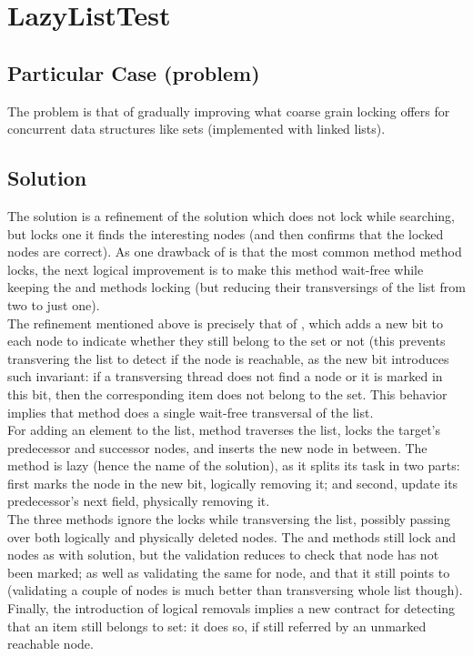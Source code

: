 \section{\textbf{LazyListTest}}

\subsection{Particular Case (problem)}
The problem is that of gradually improving what coarse grain locking
offers for concurrent data structures like sets (implemented with
linked lists).

\subsection{Solution}
The  solution is a refinement of the 
solution which does not lock while searching, but locks one it finds
the interesting nodes (and then confirms that the locked nodes are
correct). As one drawback of  is that the most
common method  method locks, the next logical improvement
is to make this method wait-free while keeping the  and
 methods locking (but reducing their transversings of the
list from two to just one). \\

The refinement mentioned above is precisely that of ,
which adds a new bit to each node to indicate whether they still
belong to the set or not (this prevents transvering the list to detect
if the node is reachable, as the new bit introduces such invariant: if
a transversing thread does not find a node or it is marked in this
bit, then the corresponding item does not belong to the set. This
behavior implies that  method does a single wait-free
transversal of the list. \\

For adding an element to the list,  method traverses the list,
locks the target's predecessor and successor nodes, and inserts the
new node in between. The    
method is lazy (hence the name of the solution), as it splits its task in
two parts: first marks the node in the new bit, logically removing it;
and second, update its predecessor's next field, physically removing
it. \\

The three methods ignore the locks while transversing the list,
possibly passing over both logically and physically deleted nodes. The
 and  methods still lock  and  nodes
as with  solution, but the validation reduces to
check that  node has not been marked; as well as validating
the same for  node, and that it still points to 
(validating a couple of nodes is much better than transversing whole
list though). Finally, the introduction of logical removals implies a
new contract for detecting that an item still belongs to set: it does
so, if still referred by an unmarked reachable node. \\

